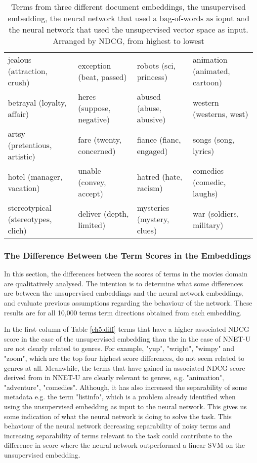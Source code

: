 \begin{table}[]
\begin{tabular}{L{3.8cm}L{3.8cm}L{3.8cm}L{3.8cm}}
jealous (attraction, crush)          & exception (beat, passed)                    & robots (sci, princess)                 & animation (animated, cartoon)              \\
betrayal (loyalty, affair)           & heres (suppose, negative)                   & abused (abuse, abusive)                & western (westerns, west)                   \\
artsy (pretentious, artistic)        & fare (twenty, concerned)                    & fiance (fianc, engaged)                & songs (song, lyrics)                       \\
hotel (manager, vacation)            & unable (convey, accept)                     & hatred (hate, racism)                  & comedies (comedic, laughs)                 \\
stereotypical (stereotypes, clich)   & deliver (depth, limited)                    & mysteries (mystery, clues)             & war (soldiers, military)                   \\                                   
	\end{tabular}\caption{Terms from three different document embeddings, the unsupervised embedding, the neural network that used a bag-of-words as ioput and the neural network that used the unsupervised vector space as input. Arranged by NDCG, from highest to lowest}
\end{table}


\subsubsection{The Difference Between the Term Scores in the Embeddings}\label{ch5:diffsection}

In this section, the differences between the scores of terms in the movies domain are qualitatively analysed. The intention is to determine what some differences are between the unsupervised embeddings and the neural network embeddings, and evaluate previous assumptions regarding the behaviour of the network. These results are for all 10,000 terms term directions obtained from each embedding. 

In the first column of  Table \ref{ch5:diff} terms that have a higher associated NDCG score in the case of the unsupervised embedding than the in the case of NNET-U are not clearly related to genres. For example, "yup", "wright", "wimpy" and "zoom", which are the top four highest score differences, do not seem related to genres at all. Meanwhile, the terms that have gained in associated NDCG score derived from in NNET-U are clearly relevant to genres, e.g. "animation", "adventure", "comedies". Although, it has also increased the separability of some metadata e.g. the term "listinfo", which is a problem already identified when using the unsupervised embedding as input to the neural network. This gives us some indication of what the neural network is doing to solve the task. This behaviour of the neural network decreasing separability of noisy terms and increasing separability of terms relevant to the task could contribute to the difference in score where the neural network outperformed a linear SVM on the unsupervised embedding. 

